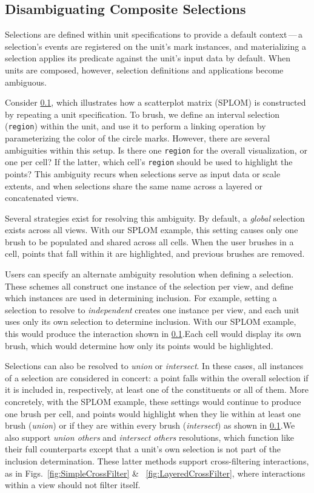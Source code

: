 \subsection{Disambiguating Composite Selections}

Selections are defined within unit specifications to provide a default
context\,---\,a selection's events are registered on the unit's mark instances,
and materializing a selection applies its predicate against the unit's input
data by default. When units are composed, however, selection definitions and
applications become ambiguous.

Consider \cref{}, which illustrates how a scatterplot matrix
(SPLOM) is constructed by repeating a unit specification. To brush, we define an
interval selection (\texttt{region}) within the unit, and use it to perform a
linking operation by parameterizing the color of the circle marks. However,
there are several ambiguities within this setup. Is there one \texttt{region}
for the overall visualization, or one per cell? If the latter, which cell's
\texttt{region} should be used to highlight the points?  This ambiguity recurs
when selections serve as input data or scale extents, and when selections share
the same name across a layered or concatenated views.

Several strategies exist for resolving this ambiguity. By default, a
\emph{global} selection exists across all views. With our SPLOM example, this
setting causes only one brush to be populated and shared across all cells. When
the user brushes in a cell, points that fall within it are highlighted, and
previous brushes are removed.

Users can specify an alternate ambiguity resolution when defining a selection.
These schemes all construct one instance of the selection per view, and define
which instances are used in determining inclusion. For example, setting a
selection to resolve to \emph{independent} creates one instance per view, and
each unit uses only its own selection to determine inclusion. With our SPLOM
example, this would produce the interaction shown in \cref{}.Each cell would display its own brush, which would determine how only its points
would be highlighted.

Selections can also be resolved to \emph{union} or \emph{intersect}. In these
cases, all instances of a selection are considered in concert: a point falls
within the overall selection if it is included in, respectively, at least one of
the constituents or all of them. More concretely, with the SPLOM example, these
settings would continue to produce one brush per cell, and points would
highlight when they lie within at least one brush (\emph{union}) or if they are
within every brush (\emph{intersect}) as shown in \cref{}.We also support \emph{union others} and \emph{intersect others} resolutions,
which function like their full counterparts except that a unit's own selection
is not part of the inclusion determination. These latter methods support
cross-filtering interactions, as in Figs.~\ref{fig:SimpleCrossFilter} \&
~\ref{fig:LayeredCrossFilter}, where interactions within a view should not
filter itself.